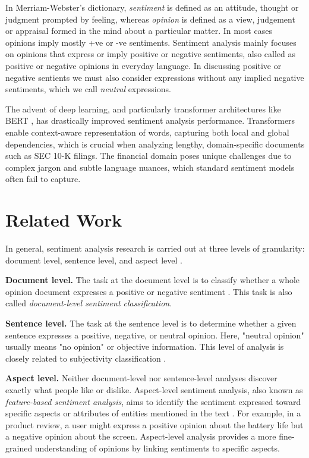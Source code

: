 \documentclass[12pt]{article}
\begin{document}
In Merriam-Webster's dictionary, \textit{sentiment} is defined as an attitude, thought or judgment prompted by feeling, whereas \textit{opinion} is defined as a view, judgement or appraisal formed in the mind about a particular matter. In most cases opinions imply mostly +ve or -ve sentiments. Sentiment analysis mainly focuses on opinions that express or imply positive or negative sentiments, also called as positive or negative opinions in everyday language. In discussing positive or negative sentients we must also consider expressions without any implied negative sentiments, which we call \textit{neutral} expressions.

The advent of deep learning, and particularly transformer architectures like BERT \citep{Devlin2019}, has drastically improved sentiment analysis performance. Transformers enable context-aware representation of words, capturing both local and global dependencies, which is crucial when analyzing lengthy, domain-specific documents such as SEC 10-K filings. The financial domain poses unique challenges due to complex jargon and subtle language nuances, which standard sentiment models often fail to capture.

\section{Related Work}
In general, sentiment analysis research is carried out at three levels of granularity: document level, sentence level, and aspect level \citep{Liu2010}.

\textbf{Document level.} The task at the document level is to classify whether a whole opinion document expresses a positive or negative sentiment \citep{Pang2002, Turney2002}. This task is also called \textit{document-level sentiment classification}.

\textbf{Sentence level.} The task at the sentence level is to determine whether a given sentence expresses a positive, negative, or neutral opinion. Here, "neutral opinion" usually means "no opinion" or objective information. This level of analysis is closely related to subjectivity classification \citep{Wiebe1999}.

\textbf{Aspect level.} Neither document-level nor sentence-level analyses discover exactly what people like or dislike. Aspect-level sentiment analysis, also known as \textit{feature-based sentiment analysis}, aims to identify the sentiment expressed toward specific aspects or attributes of entities mentioned in the text \citep{Hu2004, Liu2010}. For example, in a product review, a user might express a positive opinion about the battery life but a negative opinion about the screen. Aspect-level analysis provides a more fine-grained understanding of opinions by linking sentiments to specific aspects.
\end{document}
